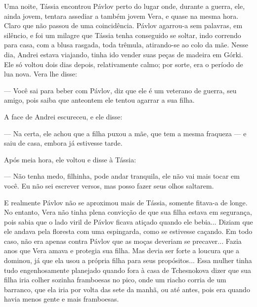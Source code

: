 Uma noite, Tássia encontrou Pávlov perto do lugar onde, durante a
guerra, ele, ainda jovem, tentara assediar a também jovem Vera, e quase
na mesma hora. Claro que não passou de uma coincidência. Pávlov
agarrou-a sem palavras, em silêncio, e foi um milagre que Tássia tenha
conseguido se soltar, indo correndo para casa, com a blusa rasgada, toda
trêmula, atirando-se ao colo da mãe. Nesse dia, Andrei estava viajando,
tinha ido vender suas peças de madeira em Górki. Ele só voltou dois dias
depois, relativamente calmo; por sorte, era o período de lua nova. Vera
lhe disse:

--- Você sai para beber com Pávlov, diz que ele é um veterano de guerra,
seu amigo, pois saiba que anteontem ele tentou agarrar a sua filha.

A face de Andrei escureceu, e ele disse:

--- Na certa, ele achou que a filha puxou a mãe, que tem a mesma
fraqueza --- e saiu de casa, embora já estivesse tarde.

Após meia hora, ele voltou e disse à Tássia:

--- Não tenha medo, filhinha, pode andar tranquila, ele não vai mais
tocar em você. Eu não sei escrever versos, mas posso fazer seus olhos
saltarem.

E realmente Pávlov não se aproximou mais de Tássia, somente fitava-a de
longe. No entanto, Vera não tinha plena convicção de que sua filha
estava em segurança, pois sabia que o lado viril de Pávlov ficava
atiçado quando ele bebia... Diziam que ele andava pela floresta com uma
espingarda, como se estivesse caçando. Em todo caso, não era apenas
contra Pávlov que as moças deveriam se precaver... Fazia anos que Vera
amava e protegia sua filha. Mas devia ser forte a loucura que a dominou,
já que ela usou a própria filha para seus propósitos... Essa mulher
tinha tudo engenhosamente planejado quando fora à casa de Tchesnokova
dizer que sua filha iria colher sozinha framboesas no pico, onde um
riacho corria de um barranco, que ela iria por volta das sete da manhã,
ou até antes, pois era quando havia menos gente e mais framboesas.

